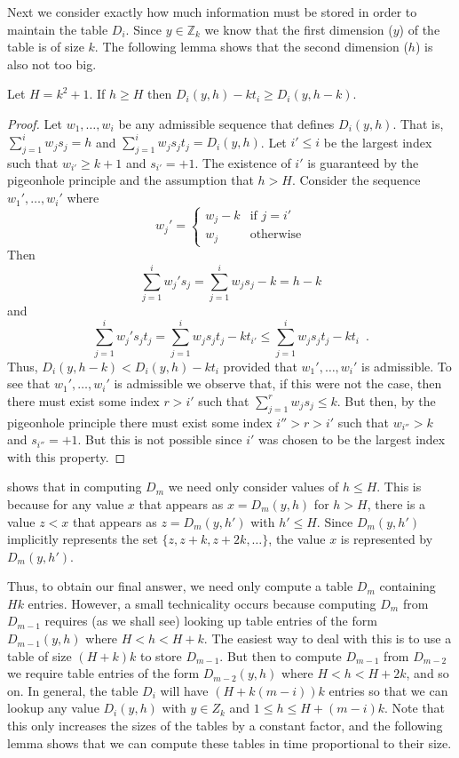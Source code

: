 \documentclass{elsart}
\begin{document}
Next we consider exactly how much information must be stored in order
to maintain the table $D_i$. Since $y\in \mathbb{Z}_k$ we know that
the first dimension ($y$) of the table is of size $k$. The following
lemma shows that the second dimension ($h$) is also not too big.

\begin{lem}
Let $H=k^2+1$.  If $h\ge H$ then $D_i(y,h) - kt_i \ge D_i(y,h-k)$.
\end{lem}

\begin{proof}
Let $w_1,\ldots,w_i$ be any admissible sequence that defines
$D_i(y,h)$.  That is,  $\sum_{j=1}^iw_js_j = h$ and $\sum_{j=1}^i w_js_jt_j
= D_i(y,h)$.  Let $i'\le i$ be the largest index such that
$w_{i'}\ge k+1$ and $s_{i'}=+1$.  The existence of $i'$ is guaranteed
by the pigeonhole principle and the
assumption that $h>H$.  Consider the sequence $w_1',\ldots,w_i'$ where
\[
     w_j' = \left\{ \begin{array}{ll}
            w_j-k & \mbox{if $j=i'$} \\
            w_j & \mbox{otherwise}  \end{array} \right.
\]
Then
\[
  \sum_{j=1}^i w_j's_j = \sum_{j=1}^i w_js_j - k = h-k
\]
and
\[
   \sum_{j=1}^i w_j's_jt_j = \sum_{j=1}^i w_js_jt_j - kt_{i'} 
    \le \sum_{j=1}^i w_js_jt_j - kt_{i} \enspace . 
\]
Thus, $D_i(y,h-k) < D_i(y,h) - kt_i$ provided that $w_1',\ldots,w_i'$
is admissible.  To see that $w_1',\ldots,w_i'$ is admissible we
observe that, if this were not the case, then there must exist some
index $r>i'$ such that $\sum_{j=1}^r w_js_j \le k$.  But then, by the
pigeonhole principle there
must exist some index $i''>r>i'$ such that $w_{i''}>k$ and
$s_{i''}=+1$.  But this is not possible since $i'$ was chosen to be
the largest index with this property.
\end{proof}

 shows that in computing $D_m$ we need only consider
values of $h\le H$.  This is because for any value $x$ that appears as
$x=D_m(y,h)$ for $h>H$, there is a value $z< x$ that appears as
$z=D_m(y,h')$ with $h'\le H$.  Since $D_m(y,h')$ implicitly represents the
set $\{z, z+k, z+2k,\ldots\}$, the value $x$ is represented by
$D_m(y,h')$.

Thus, to obtain our final answer, we need only compute a
table $D_m$ containing $Hk$ entries.  However, a small technicality
occurs because computing $D_m$ from $D_{m-1}$ requires (as we shall
see) looking up table entries of the form $D_{m-1}(y,h)$ where
$H<h<H+k$.  The easiest way to deal with this is to use a table of
size $(H+k)k$ to store $D_{m-1}$.  But then to compute $D_{m-1}$ from
$D_{m-2}$ we require table entries of the form $D_{m-2}(y,h)$ where
$H<h<H+2k$, and so on.  In general, the table $D_i$ will have
$(H+k(m-i))k$ entries so that we can lookup any value $D_i(y,h)$ with
$y\in Z_k$ and $1\le h\le H+(m-i)k$.  Note that this only increases
the sizes of the tables by a constant factor, and the following lemma
shows that we can compute these tables in time proportional to their
size.
\end{document}
